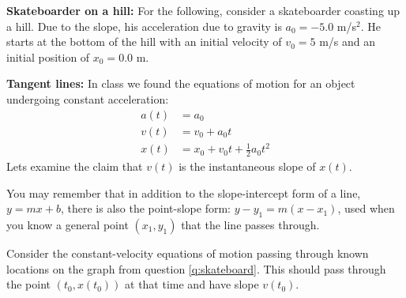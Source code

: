 \documentclass{handout}
\begin{document}
\begin{questions}
    \question \textbf{Skateboarder on a hill:} \label{q:skateboard}For the following, consider a skateboarder coasting up a hill. Due to the slope, his acceleration due to gravity is $a_0=-5.0$ m/s$^2$. He starts at the bottom of the hill with an initial velocity of $v_0=5$ m/s and an initial position of $x_0=0.0$ m.

    \question \textbf{Tangent lines:} In class we found the equations of motion for an object undergoing constant acceleration: 
    \begin{align}
        a(t) &= a_0\\
        v(t) &= v_0 + a_0 t\\
        x(t) &= x_0 + v_0 t + \frac{1}{2} a_0 t^2
    \end{align}
    Lets examine the claim that $v(t)$ is the instantaneous slope of $x(t)$. 

    You may remember that in addition to the slope-intercept form of a line, $y=mx+b$, there is also the point-slope form: $y-y_1=m(x-x_1)$, used when you know a general point $(x_1, y_1)$ that the line passes through. 

    Consider the constant-velocity equations of motion passing through known locations on the graph from question \ref{q:skateboard}. This should pass through the point $(t_0, x(t_0))$ at that time and have slope $v(t_0)$. 
\end{questions}
\end{document}
